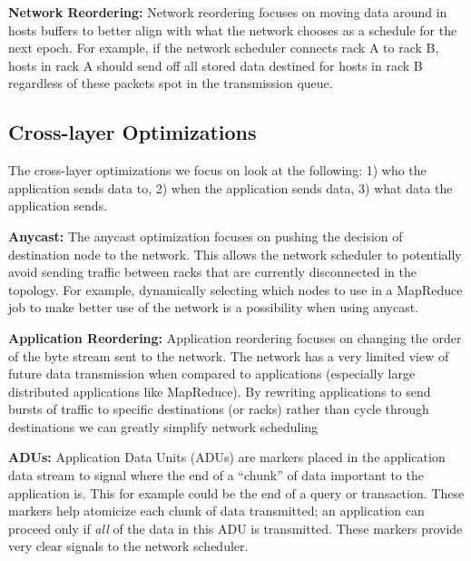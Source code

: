 {\bf Network Reordering:} Network reordering focuses on moving data around in
hosts buffers to better align with what the network chooses as a schedule for
the next epoch. For example, if the network scheduler connects rack A to rack B,
hosts in rack A should send off all stored data destined for hosts in rack B
regardless of these packets spot in the transmission queue. 

\newpage\phantom{t}
\subsection{Cross-layer Optimizations}
\label{sec:cross_opts}

The cross-layer optimizations we focus on look at the following: 1) who the
application sends data to, 2) when the application sends data, 3) what data the
application sends.

{\bf Anycast:} The anycast optimization focuses on pushing the decision of
destination node to the network. This allows the network scheduler to
potentially avoid sending traffic between racks that are currently disconnected
in the topology. For example, dynamically selecting which nodes to use in a
MapReduce job to make better use of the network is a possibility when using
anycast. 

{\bf Application Reordering:} Application reordering focuses on changing the
order of the byte stream sent to the network. The network has a very limited
view of future data transmission when compared to applications (especially large
distributed applications like MapReduce). By rewriting applications to send
bursts of traffic to specific destinations (or racks) rather than cycle through
destinations we can greatly simplify network scheduling 

{\bf ADUs:} Application Data Units (ADUs) are markers placed in the application
data stream to signal where the end of a ``chunk'' of data important to the
application is. This for example could be the end of a query or
transaction. These markers help atomicize each chunk of data transmitted; an
application can proceed only if \emph{all} of the data in this ADU is
transmitted. These markers provide very clear signals to the network
scheduler. 
